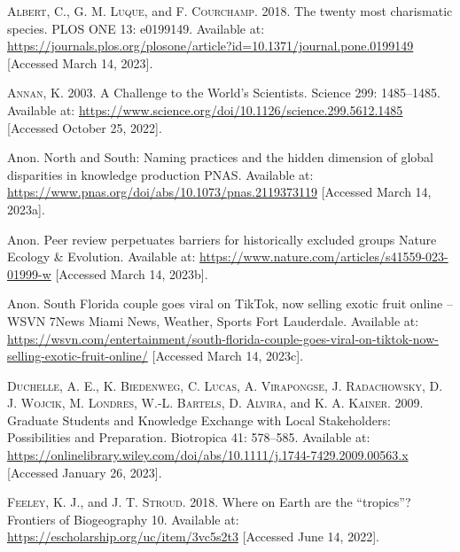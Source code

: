 \documentclass[
  12pt,
  man, donotrepeattitle]{apa6}
\newlength{\cslhangindent}
\newlength{\cslentryspacingunit} %
\newenvironment{CSLReferences}[2] %
 {%
  \setlength{\parindent}{0pt}
  \ifodd #1
  \let\oldpar\par
  \def\par{\hangindent=\cslhangindent\oldpar}
  \fi
  \setlength{\parskip}{#2\cslentryspacingunit}
 }%
 {}
\begin{document}
\hypertarget{refs}{}
\begin{CSLReferences}{1}{0}
\leavevmode{}%
\textsc{Albert, C.}, \textsc{G. M. Luque}, and \textsc{F. Courchamp}. 2018. The twenty most charismatic species. PLOS ONE 13: e0199149. Available at: \url{https://journals.plos.org/plosone/article?id=10.1371/journal.pone.0199149} {[}Accessed March 14, 2023{]}.

\leavevmode{}%
\textsc{Annan, K.} 2003. A {Challenge} to the {World}'s {Scientists}. Science 299: 1485--1485. Available at: \url{https://www.science.org/doi/10.1126/science.299.5612.1485} {[}Accessed October 25, 2022{]}.

\leavevmode{}%
Anon. North and {South}: {Naming} practices and the hidden dimension of global disparities in knowledge production {\textbar} {PNAS}. Available at: \url{https://www.pnas.org/doi/abs/10.1073/pnas.2119373119} {[}Accessed March 14, 2023a{]}.

\leavevmode{}%
Anon. Peer review perpetuates barriers for historically excluded groups {\textbar} {Nature} {Ecology} \& {Evolution}. Available at: \url{https://www.nature.com/articles/s41559-023-01999-w} {[}Accessed March 14, 2023b{]}.

\leavevmode{}%
Anon. South {Florida} couple goes viral on {TikTok}, now selling exotic fruit online -- {WSVN} {7News} {\textbar} {Miami} {News}, {Weather}, {Sports} {\textbar} {Fort} {Lauderdale}. Available at: \url{https://wsvn.com/entertainment/south-florida-couple-goes-viral-on-tiktok-now-selling-exotic-fruit-online/} {[}Accessed March 14, 2023c{]}.

\leavevmode{}%
\textsc{Duchelle, A. E.}, \textsc{K. Biedenweg}, \textsc{C. Lucas}, \textsc{A. Virapongse}, \textsc{J. Radachowsky}, \textsc{D. J. Wojcik}, \textsc{M. Londres}, \textsc{W.-L. Bartels}, \textsc{D. Alvira}, and \textsc{K. A. Kainer}. 2009. Graduate {Students} and {Knowledge} {Exchange} with {Local} {Stakeholders}: {Possibilities} and {Preparation}. Biotropica 41: 578--585. Available at: \url{https://onlinelibrary.wiley.com/doi/abs/10.1111/j.1744-7429.2009.00563.x} {[}Accessed January 26, 2023{]}.

\leavevmode{}%
\textsc{Feeley, K. J.}, and \textsc{J. T. Stroud}. 2018. Where on {Earth} are the {``tropics''}? Frontiers of Biogeography 10. Available at: \url{https://escholarship.org/uc/item/3vc5s2t3} {[}Accessed June 14, 2022{]}.


\end{CSLReferences}
\end{document}
